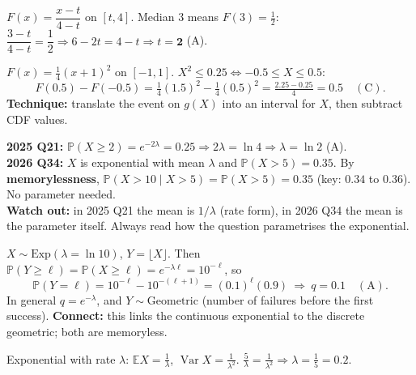\documentclass[11pt,a4paper]{article}
\newcommand{\E}{\mathbb{E}}
\newcommand{\Var}{\operatorname{Var}}
\renewcommand{\Pr}{\mathbb{P}}
\begin{document}
\begin{example}
$F(x)=\dfrac{x-t}{4-t}$ on $[t,4]$. Median $3$ means $F(3)=\tfrac12$: $\dfrac{3-t}{4-t}=\dfrac12\Rightarrow 6-2t=4-t\Rightarrow t=\mathbf2$ \quad (A).
\end{example}

\begin{example}
$F(x)=\frac14(x+1)^2$ on $[-1,1]$. $X^2\le0.25\iff-0.5\le X\le0.5$:
\[F(0.5)-F(-0.5)=\tfrac14(1.5)^2-\tfrac14(0.5)^2=\tfrac{2.25-0.25}{4}=\mathbf{0.5}\quad(\text{C}).\]
\textbf{Technique:} translate the event on $g(X)$ into an interval for $X$, then subtract CDF values.
\end{example}

\begin{example}
\textbf{2025 Q21:} $\Pr(X\ge2)=e^{-2\lambda}=0.25\Rightarrow2\lambda=\ln4\Rightarrow\lambda=\ln2$ \quad (A).\\
\textbf{2026 Q34:} $X$ is exponential with mean $\lambda$ and $\Pr(X>5)=0.35$. By \textbf{memorylessness},
$\Pr(X>10\mid X>5)=\Pr(X>5)=\mathbf{0.35}$ (key: $0.34$ to $0.36$). No parameter needed.\\
\textbf{Watch out:} in 2025 Q21 the mean is $1/\lambda$ (rate form), in 2026 Q34 the mean is the parameter itself. Always read how the question parametrises the exponential.
\end{example}

\begin{example}
$X\sim\text{Exp}(\lambda=\ln10)$, $Y=\lfloor X\rfloor$. Then $\Pr(Y\ge\ell)=\Pr(X\ge\ell)=e^{-\lambda\ell}=10^{-\ell}$, so
\[\Pr(Y=\ell)=10^{-\ell}-10^{-(\ell+1)}=(0.1)^\ell(0.9)\ \Rightarrow\ q=\mathbf{0.1}\quad(\text{A}).\]
In general $q=e^{-\lambda}$, and $Y\sim\text{Geometric}$ (number of failures before the first success). \textbf{Connect:} this links the continuous exponential to the discrete geometric; both are memoryless.
\end{example}

\begin{example}[2024 Q57 (2 marks, NAT): when does $5\,\E X=\Var X$?]
Exponential with rate $\lambda$: $\E X=\tfrac1\lambda$, $\Var X=\tfrac1{\lambda^2}$. $\tfrac5\lambda=\tfrac1{\lambda^2}\Rightarrow\lambda=\tfrac15=\mathbf{0.2}$.
\end{example}
\end{document}
